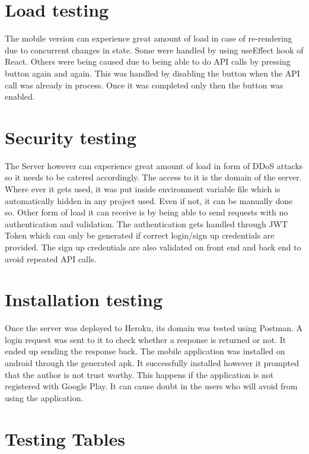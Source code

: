 \section{Load testing}
The mobile version can experience great amount of load in case of re-rendering due to concurrent changes in state. Some were handled by using useEffect hook of React. Others were being caused due to being able to do API calls by pressing button again and again. This was handled by disabling the button when the API call was already in process. Once it was completed only then the button was enabled.
\section{Security testing}
The Server however can experience great amount of load in form of DDoS attacks so it needs to be catered accordingly. The access to it is the domain of the server. Where ever it gets used, it was put inside environment variable file which is automatically hidden in any project used. Even if not, it can be manually done so. Other form of load it can receive is by being able to send requests with no authentication and validation. The authentication gets handled through JWT Token which can only be generated if correct login/sign up credentials are provided. The sign up credentials are also validated on front end and back end to avoid repeated API calls.
\section{Installation testing}
Once the server was deployed to Heroku, its domain was tested using Postman. A login request was sent to it to check whether a response is returned or not. It ended up sending the response back. The mobile application was installed on android through the generated apk. It successfully installed however it prompted that the author is not trust worthy. This happens if the application is not registered with Google Play. It can cause doubt in the users who will avoid from using the application.
\newpage

\section{Testing Tables}
\noindent









